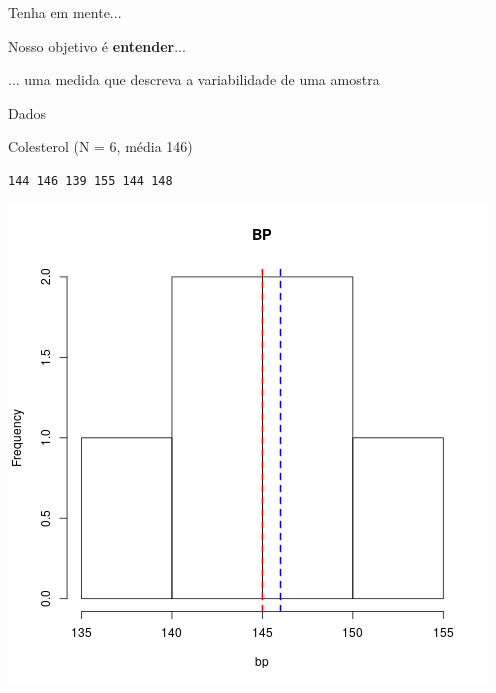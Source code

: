 \documentclass{beamer}
\begin{document}
\begin{frame}[label=objetivo]{\scriptsize Tenha em mente...}
  \begin{center}
    Nosso objetivo é {\bf entender}...

    \bigskip
    ... uma medida que descreva a variabilidade de uma amostra
  \end{center}
\end{frame}

\begin{frame}[fragile]{\scriptsize Dados}
  \begin{exampleblock}{\scriptsize Colesterol (N = 6, média 146)}
    \begin{center}
    \tiny
\begin{verbatim}
144 146 139 155 144 148
\end{verbatim}
    \bigskip
    \includegraphics[height=.5\textheight]{Cap3/histograma-bp}
  \end{center}
\end{exampleblock}
\end{frame}
\end{document}
